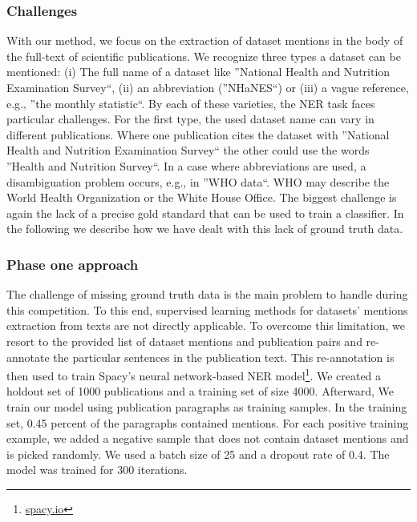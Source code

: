\subsubsection{Challenges}
With our method, we focus on the extraction of dataset mentions in the body of the full-text of scientific publications. We recognize three types a dataset can be mentioned: (i) The full name of a dataset like ''National Health and Nutrition Examination Survey``, (ii) an abbreviation (''NHaNES``) or (iii) a vague reference, e.g., ''the monthly statistic``. 
By each of these varieties, the NER task faces particular challenges. For the first type, the used dataset name can vary in different publications. Where one publication cites the dataset with ''National Health and Nutrition Examination Survey`` the other could use the words  ''Health and Nutrition Survey``.
In a case where abbreviations are used, a disambiguation problem occurs, e.g., in ''WHO data``. WHO may describe the World Health Organization or the White House Office.
The biggest challenge is again the lack of a precise gold standard that can be used to train a classifier.
In the following we describe how we have dealt with this lack of ground truth data.

\subsubsection{Phase one approach}
The challenge of missing ground truth data is the main problem to handle during this competition. To this end, supervised learning methods for datasets' mentions extraction from texts are not directly applicable. To overcome this limitation, we resort to the provided list of dataset mentions and publication pairs and re-annotate the particular sentences in the publication text. This re-annotation is then used to train Spacy's neural network-based NER model\footnote{\url{spacy.io}}. We created a holdout set of 1000 publications and a training set of size 4000. Afterward, We train our model using publication paragraphs as training samples. In the training set, 0.45 percent of the paragraphs contained mentions.  For each positive training example, we added a negative sample that does not contain dataset mentions and is picked randomly.   
We used a batch size of 25 and a dropout rate of 0.4. The model was trained for 300 iterations.
